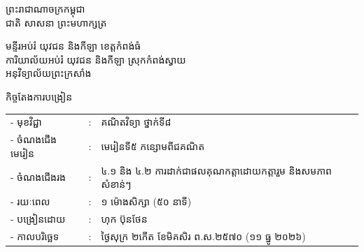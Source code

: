 \documentclass[a4paper,10pt]{article}
\newcommand{\khmflourish}{{\Tacteing\fontsize{36pt}{14pt}\selectfont\raisebox{-5pt}{3}}}
\begin{document}
\fontsize{10pt}{15.2pt}\selectfont

\begin{center}
  {\muol\fontsize{11pt}{16pt}\selectfont ព្រះរាជាណាចក្រកម្ពុជា}\\[2pt]
  {\muol\fontsize{10pt}{15pt}\selectfont ជាតិ សាសនា ព្រះមហាក្សត្រ}\\[1pt]
  \khmflourish
\end{center}

\vspace{-28pt}
{\muol\fontsize{9.5pt}{12.5pt}\selectfont
មន្ទីរអប់រំ យុវជន និងកីឡា ខេត្តកំពង់ធំ\\
ការិយាល័យអប់រំ យុវជន និងកីឡា ស្រុកកំពង់ស្វាយ\\
អនុវិទ្យាល័យព្រះក្រសាំង}

\vspace{1pt}
\begin{center}
  {\muol\fontsize{10pt}{14pt}\selectfont កិច្ចតែងការបង្រៀន}
\end{center}
\vspace{0pt}

{\renewcommand{\arraystretch}{0.95}
\hspace*{4.05cm}%
\begin{tabular}{@{}l l l@{}}
  - \hspace{0.35cm} មុខវិជ្ជា & : & គណិតវិទ្យា ថ្នាក់ទី៨ \\
  - \hspace{0.35cm} ចំណងជើងមេរៀន & : & មេរៀនទី៥ កន្សោមពីជគណិត \\
  - \hspace{0.35cm} ចំណងជើងរង & : & ៤.១ និង ៤.២ ការដាក់ជាផលគុណកត្តាដោយកត្តារួម និងសមភាពសំខាន់ៗ \\
  - \hspace{0.35cm} រយៈពេល & : & ១ ម៉ោងសិក្សា (៥០ នាទី) \\
  - \hspace{0.35cm} បង្រៀនដោយ & : & ហុក ប៊ុនថែន \\
  - \hspace{0.35cm} កាលបរិច្ឆេទ & : & ថ្ងៃសុក្រ ២កើត ខែមិគសិរ ព.ស.២៥៧០ (១១ ធ្នូ ២០២៦) \\
\end{tabular}
}

\vspace{1pt}
\end{document}
